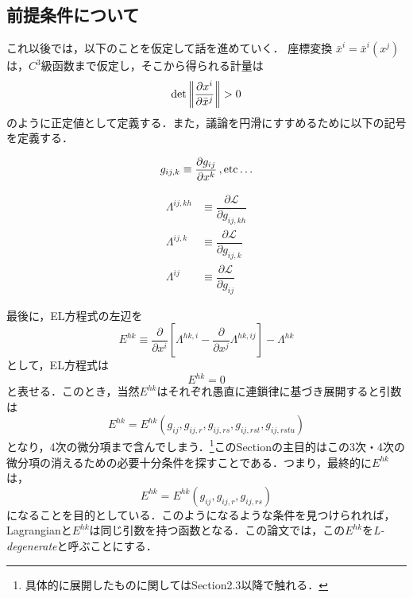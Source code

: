 \documentclass[main]{subfiles}
\begin{document}
\subsection{前提条件について}
これ以後では，以下のことを仮定して話を進めていく．
座標変換 \(\bar{x}^i=\bar{x}^i(x^j)\)は，\(C^3\)級函数まで仮定し，そこから得られる計量は
\begin{equation*}
    \det\left\lVert\dfrac{\partial x^i}{\partial \bar{x}^j}\right\rVert>0
\end{equation*}
のように正定値として定義する．また，議論を円滑にすすめるために以下の記号を定義する．

\begin{equation*}
    g_{ij,k} \equiv \dfrac{\partial g_{ij} }{\partial x^k } \, , \rm{etc} \ldots
\end{equation*}

\begin{equation*}
    \begin{split}
        \varLambda^{ij,kh} &\equiv \dfrac{\partial \mathscr{L}  }{\partial g_{ij,kh} } \\
        \varLambda^{ij,k} &\equiv \dfrac{\partial \mathscr{L}  }{\partial g_{ij,k} } \\
        \varLambda^{ij} &\equiv \dfrac{\partial \mathscr{L}  }{\partial g_{ij} }
    \end{split}
    \tag{2.2} \label{lam1}
\end{equation*}

最後に，EL方程式の左辺を
\begin{equation*}
    E^{hk} \equiv \dfrac{\partial }{\partial x^i }\left[ \varLambda^{hk,i} - \dfrac{\partial }{\partial x^j }\varLambda^{hk,ij} \right] - \varLambda^{hk}
    \tag{2.4} \label{elleft}
\end{equation*}
として，EL方程式は
\begin{equation*}
    E^{hk} =0
    \tag{2.3} \label{el}
\end{equation*}
と表せる．このとき，当然\(E^{hk}\)はそれぞれ愚直に連鎖律に基づき展開すると引数は
\begin{equation*}
    E^{hk} = E^{hk}(g_{ij}, g_{ij,r}, g_{ij,rs}, g_{ij,rst}, g_{ij,rstu})
    \tag{2.5} \label{ehk4}
\end{equation*}
となり，4次の微分項まで含んでしまう．\footnote{具体的に展開したものに関してはSection2.3以降で触れる．}このSectionの主目的はこの3次・4次の微分項の消えるための必要十分条件を探すことである．つまり，最終的に\(E^{hk}\)は，
\begin{equation*}
    E^{hk} = E^{hk}(g_{ij}, g_{ij,r}, g_{ij,rs})
    \tag{2.6} \label{ehk2}
\end{equation*}
になることを目的としている．このようになるような条件を見つけられれば， Lagrangianと\(E^{hk}\)は同じ引数を持つ函数となる．この論文では，この\(E^{hk}\)を\textit{L-degenerate}と呼ぶことにする．
\end{document}
